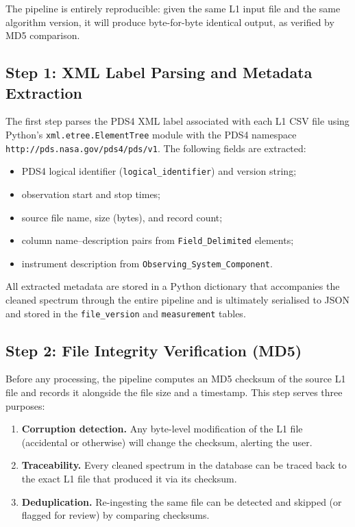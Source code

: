\documentclass[a4paper,twocolumn,10pt]{article}
\begin{document}
The pipeline is entirely reproducible: given the same L1 input file
and the same algorithm version, it will produce byte-for-byte identical
output, as verified by MD5 comparison.

\subsection{Step 1: XML Label Parsing and Metadata Extraction}

The first step parses the PDS4 XML label associated with each L1 CSV
file using Python's \texttt{xml.etree.ElementTree} module with the
PDS4 namespace \texttt{http://pds.nasa.gov/pds4/pds/v1}.  The
following fields are extracted:

\begin{itemize}[nosep,leftmargin=*]
  \item PDS4 logical identifier (\texttt{logical\_identifier}) and
    version string;
  \item observation start and stop times;
  \item source file name, size (bytes), and record count;
  \item column name--description pairs from
    \texttt{Field\_Delimited} elements;
  \item instrument description from
    \texttt{Observing\_System\_Component}.
\end{itemize}

All extracted metadata are stored in a Python dictionary that
accompanies the cleaned spectrum through the entire pipeline and is
ultimately serialised to JSON and stored in the \texttt{file\_version}
and \texttt{measurement} tables.

\subsection{Step 2: File Integrity Verification (MD5)}

Before any processing, the pipeline computes an MD5 checksum of the
source L1 file and records it alongside the file size and a
timestamp.  This step serves three purposes:

\begin{enumerate}[nosep,leftmargin=*]
  \item \textbf{Corruption detection.}  Any byte-level modification of
    the L1 file (accidental or otherwise) will change the checksum,
    alerting the user.
  \item \textbf{Traceability.}  Every cleaned spectrum in the database
    can be traced back to the exact L1 file that produced it via its
    checksum.
  \item \textbf{Deduplication.}  Re-ingesting the same file can be
    detected and skipped (or flagged for review) by comparing
    checksums.
\end{enumerate}
\end{document}

